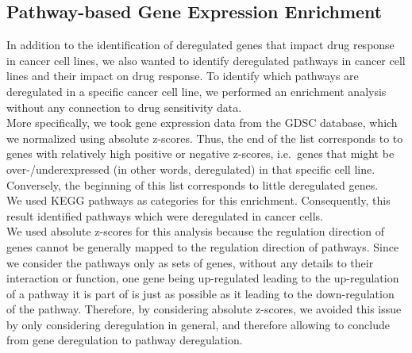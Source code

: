 \subsection{Pathway-based Gene Expression Enrichment}\label{subsec:sd_enrichment_2}
In addition to the identification of deregulated genes that impact drug response in cancer cell lines, we also wanted to identify deregulated pathways in cancer cell lines and their impact on drug response. To identify which pathways are deregulated in a specific cancer cell line, we performed an enrichment analysis without any connection to drug sensitivity data.\\
More specifically, we took gene expression data from the GDSC database, which we normalized using absolute z-scores. Thus, the end of the list corresponds to to genes with relatively high positive or negative z-scores, i.e.\ genes that might be over-/underexpressed (in other words, deregulated) in that specific cell line. Conversely, the beginning of this list corresponds to little deregulated genes.\\
We used KEGG pathways as categories for this enrichment. Consequently, this result identified pathways which were deregulated in cancer cells.\\
We used absolute z-scores for this analysis because the regulation direction of genes cannot be generally mapped to the regulation direction of pathways. Since we consider the pathways only as sets of genes, without any details to their interaction or function, one gene being up-regulated leading to the up-regulation of a pathway it is part of is just as possible as it leading to the down-regulation of the pathway. Therefore, by considering absolute z-scores, we avoided this issue by only considering deregulation in general, and therefore allowing to conclude from gene deregulation to pathway deregulation.
